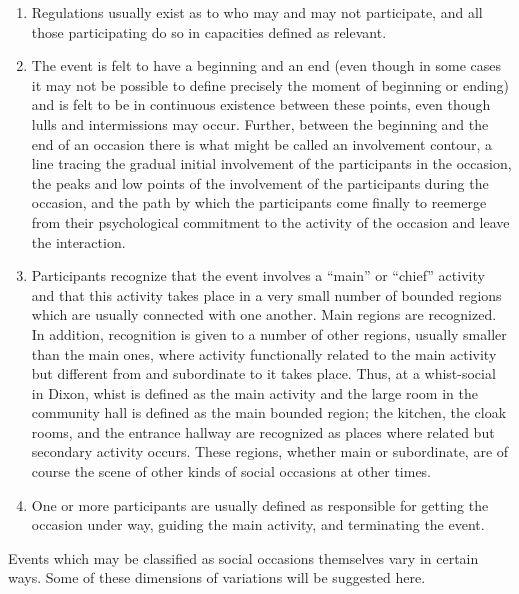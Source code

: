 \documentclass[twoside,symmetric,nobib,justified]{tufte-book}
\begin{document}
\begin{enumerate}
\item
  Regulations usually exist as to who may and may not participate, and
  all those participating do so in capacities defined as relevant.
\item
  The event is felt to have a beginning and an end (even though in some
  cases it may not be possible to define precisely the moment of
  beginning or ending) and is felt to be in continuous existence between
  these points, even though lulls and intermissions may occur. Further,
  between the beginning and the end of an occasion there is what might
  be called an involvement contour, a line tracing the gradual initial
  involvement of the participants in the occasion, the peaks and low
  points of the involvement of the participants during the occasion, and
  the path by which the participants come finally to reemerge from their
  psychological commitment to the activity of the occasion and leave the
  interaction.
\item
  Participants recognize that the event involves a ``main'' or ``chief''
  activity and that this activity takes place in a very small number of
  bounded regions which are usually connected with one another. Main
  regions are recognized. In addition, recognition is given to a number
  of other regions, usually smaller than the main ones, where activity
  functionally related to the main activity but different from and
  subordinate to it takes place. Thus, at a whist-social in Dixon, whist
  is defined as the main activity and the large room in the community
  hall is defined as the main bounded region; the kitchen, the cloak
  rooms, and the entrance hallway are recognized as places where related
  but secondary activity occurs. These regions, whether main or
  subordinate, are of course the scene of other kinds of social
  occasions at other times.
\item
  One or more participants are usually defined as responsible for
  getting the occasion under way, guiding the main activity, and
  terminating the event.
\end{enumerate}

Events which may be classified as social occasions themselves vary in
certain ways. Some of these dimensions of variations will be suggested
here.
\end{document}
